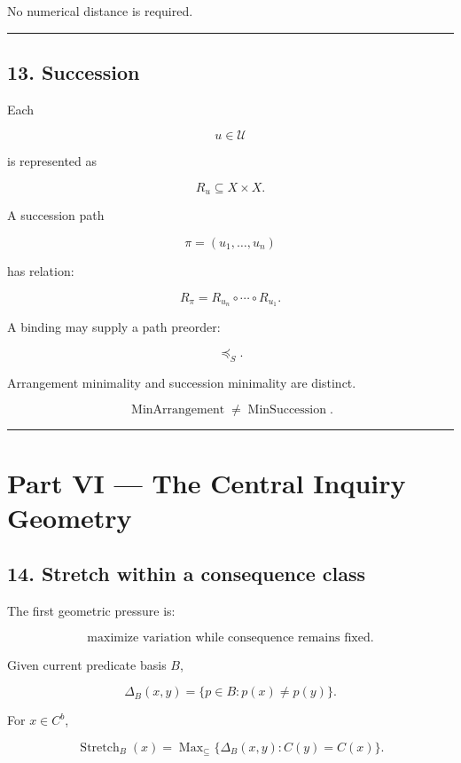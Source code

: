 \documentclass[
]{article}
\begin{document}
No numerical distance is required.

\begin{center}\rule{0.5\linewidth}{0.5pt}\end{center}

\subsection{13. Succession}\label{succession}

Each

\[
u\in\mathcal U
\]

is represented as

\[
R_u\subseteq X\times X.
\]

A succession path

\[
\pi=(u_1,\ldots,u_n)
\]

has relation:

\[
R_\pi
=
R_{u_n}\circ\cdots\circ R_{u_1}.
\]

A binding may supply a path preorder:

\[
\preceq_S.
\]

Arrangement minimality and succession minimality are distinct.

\[
\boxed{
\operatorname{MinArrangement}
\neq
\operatorname{MinSuccession}.
}
\]

\begin{center}\rule{0.5\linewidth}{0.5pt}\end{center}

\section{Part VI --- The Central Inquiry
Geometry}\label{part-vi-the-central-inquiry-geometry}

\subsection{14. Stretch within a consequence
class}\label{stretch-within-a-consequence-class}

The first geometric pressure is:

\[
\boxed{
\text{maximize variation while consequence remains fixed.}
}
\]

Given current predicate basis \(B\),

\[
\Delta_B(x,y)
=
\{p\in B:p(x)\neq p(y)\}.
\]

For \(x\in C^b\),

\[
\boxed{
\operatorname{Stretch}_B(x)
=
\operatorname{Max}_{\subseteq}
\{
\Delta_B(x,y):
C(y)=C(x)
\}.
}
\]
\end{document}
